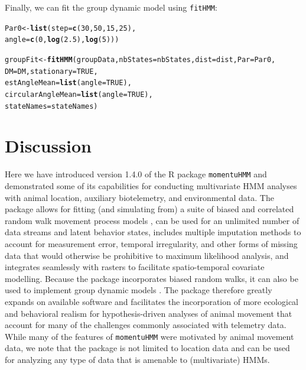 \documentclass[12pt]{article}\usepackage[]{graphicx}\usepackage[]{color}
\makeatletter
\newcommand{\hlnum}[1]{\textcolor[rgb]{0.686,0.059,0.569}{#1}}%
\newcommand{\hlstd}[1]{\textcolor[rgb]{0.345,0.345,0.345}{#1}}%
\newcommand{\hlkwb}[1]{\textcolor[rgb]{0.69,0.353,0.396}{#1}}%
\newcommand{\hlkwc}[1]{\textcolor[rgb]{0.333,0.667,0.333}{#1}}%
\newcommand{\hlkwd}[1]{\textcolor[rgb]{0.737,0.353,0.396}{\textbf{#1}}}%
\newenvironment{kframe}{%
 \def\at@end@of@kframe{}%
 \ifinner\ifhmode%
  \def\at@end@of@kframe{\end{minipage}}%
  \begin{minipage}{\columnwidth}%
 \fi\fi%
 \def\FrameCommand##1{\hskip\@totalleftmargin \hskip-\fboxsep
 \colorbox{shadecolor}{##1}\hskip-\fboxsep
     \hskip-\linewidth \hskip-\@totalleftmargin \hskip\columnwidth}%
 \MakeFramed {\advance\hsize-\width
   \@totalleftmargin\z@ \linewidth\hsize
   \@setminipage}}%
 {\par\unskip\endMakeFramed%
 \at@end@of@kframe}
\newenvironment{knitrout}{}{} %
\makeatother
\begin{document}
Finally, we can fit the group dynamic model using \verb|fitHMM|:
\begin{knitrout}
\color{fgcolor}\begin{kframe}
\begin{alltt}
\hlstd{Par0} \hlkwb{<-} \hlkwd{list}\hlstd{(}\hlkwc{step} \hlstd{=} \hlkwd{c}\hlstd{(}\hlnum{30}\hlstd{,}\hlnum{50}\hlstd{,}\hlnum{15}\hlstd{,}\hlnum{25}\hlstd{),}
             \hlkwc{angle} \hlstd{=} \hlkwd{c}\hlstd{(}\hlnum{0}\hlstd{,}\hlkwd{log}\hlstd{(}\hlnum{2.5}\hlstd{),}\hlkwd{log}\hlstd{(}\hlnum{5}\hlstd{)))}

\hlstd{groupFit} \hlkwb{<-} \hlkwd{fitHMM}\hlstd{(groupData,} \hlkwc{nbStates}\hlstd{=nbStates,} \hlkwc{dist}\hlstd{=dist,} \hlkwc{Par}\hlstd{=Par0,}
                   \hlkwc{DM} \hlstd{= DM,} \hlkwc{stationary} \hlstd{=} \hlnum{TRUE}\hlstd{,}
                   \hlkwc{estAngleMean} \hlstd{=} \hlkwd{list}\hlstd{(}\hlkwc{angle} \hlstd{=} \hlnum{TRUE}\hlstd{),}
                   \hlkwc{circularAngleMean} \hlstd{=} \hlkwd{list}\hlstd{(}\hlkwc{angle} \hlstd{=} \hlnum{TRUE}\hlstd{),}
                   \hlkwc{stateNames} \hlstd{= stateNames)}
\end{alltt}
\end{kframe}
\end{knitrout}

\section{Discussion}
Here we have introduced version 1.4.0 of the R package \verb|momentuHMM| and demonstrated some of its capabilities for conducting multivariate HMM analyses with animal location, auxiliary biotelemetry, and environmental data. The package allows for fitting (and simulating from) a suite of biased and correlated random walk movement process models \citep[e.g.][]{McClintockEtAl2012}, can be used for an unlimited number of data streams and latent behavior states, includes multiple imputation methods to account for measurement error, temporal irregularity, and other forms of missing data that would otherwise be prohibitive to maximum likelihood analysis, and integrates seamlessly with rasters to facilitate spatio-temporal covariate modelling. Because the package incorporates biased random walks, it can also be used to implement group dynamic models \cite[e.g.][]{LangrockEtAl2014}. The package therefore greatly expands on available software and facilitates the incorporation of more ecological and behavioral realism for hypothesis-driven analyses of animal movement that account for many of the challenges commonly associated with telemetry data. While many of the features of \verb|momentuHMM| were motivated by animal movement data, we note that the package is not limited to location data and can be used for analyzing any type of data that is amenable to (multivariate) HMMs.
\end{document}
